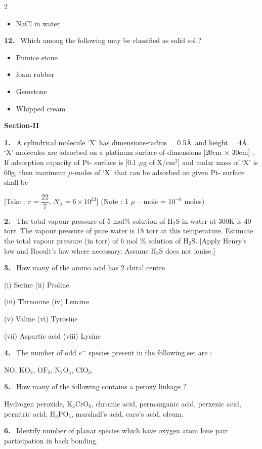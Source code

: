 \documentclass[10pt]{extarticle}
\newcommand{\sect}[1]{\par\smallskip\noindent\textbf{#1}\par}
\newcommand{\qn}[1]{\par\smallskip\noindent\textbf{#1.}~}
\newenvironment{qoptions}{\begin{itemize}[leftmargin=1.8em,itemsep=1pt,topsep=2pt,label={}]}{\end{itemize}}
\newcommand{\opt}[2]{\item[(#1)] #2}
\begin{document}
\begin{multicols}{2}
\begin{qoptions}
\opt{D}{NaCl in water}
\end{qoptions}
\qn{12} Which among the following may be classified as solid sol ?
\begin{qoptions}
\opt{A}{Pumice stone}
\opt{B}{foam rubber}
\opt{C}{Gemstone}
\opt{D}{Whipped cream}
\end{qoptions}
\sect{Section-II}
\qn{1} A cylindrical molecule `X' has dimensions-radius = 0.5\AA\ and height = 4\AA. `X' molecules are adsorbed on a platinum surface of dimensions [20cm $\times$ 30cm] . If adsorption capacity of Pt- surface is [0.1 $\mu$g of X/cm$^2$] and molar mass of `X' is 60g, then maximum $\mu$-moles of `X' that can be adsorbed on given Pt- surface shall be

[Take : $\pi=\dfrac{22}{7}$, $N_A=6\times10^{23}$] (Note : 1 $\mu$ -- mole = $10^{-6}$ moles)
\qn{2} The total vapour pressure of 5 mol\% solution of $\mathrm{H_2S}$ in water at 300K is 40 torr. The vapour pressure of pure water is 18 torr at this temperature. Estimate the total vapour pressure (in torr) of 6 mol \% solution of $\mathrm{H_2S}$. [Apply Henry's law and Raoult's law where necessary. Assume $\mathrm{H_2S}$ does not ionise.]
\qn{3} How many of the amino acid has 2 chiral centre

(i) Serine \qquad (ii) Proline

(iii) Threonine \qquad (iv) Leucine

(v) Valine \qquad (vi) Tyrosine

(vii) Aspartic acid \qquad (viii) Lysine
\qn{4} The number of odd $e^-$ species present in the following set are :

NO, $\mathrm{KO_2}$, $\mathrm{OF_2}$, $\mathrm{N_2O_4}$, $\mathrm{ClO_3}$.
\qn{5} How many of the following contains a peroxy linkage ?

Hydrogen peroxide, $\mathrm{K_3CrO_8}$, chromic acid, permanganic acid, perxenic acid, pernitric acid, $\mathrm{H_3PO_5}$, marshall's acid, caro's acid, oleum.
\qn{6} Identify number of planar species which have oxygen atom lone pair participation in back bonding.


\end{multicols}
\end{document}
